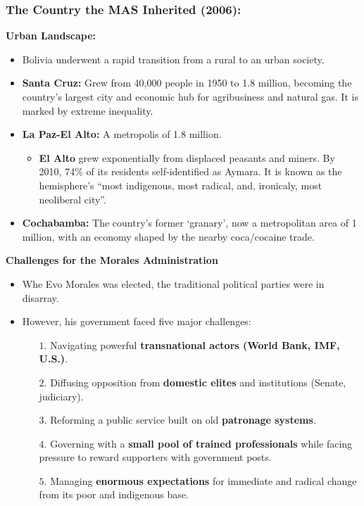 \documentclass{article}
\begin{document}
    \subsubsection{The Country the MAS Inherited (2006):}
    \noindent \textbf{Urban Landscape:}
    \begin{itemize}
        \item Bolivia underwent a rapid transition from a rural to an urban
        society.
        \item \textbf{Santa Cruz:} Grew from 40,000 people in 1950 to 1.8
        million, becoming the country's largest city and economic hub for
        agribusiness and natural gas. It is marked by extreme inequality.
        \item \textbf{La Paz-El Alto:} A metropolis of 1.8 million.
        \begin{itemize}
            \item \textbf{El Alto} grew exponentially from displaced
            peasants and miners. By 2010, 74\% of its residents
            self-identified as Aymara. It is known as the hemisphere's
            ``most indigenous, most radical, and, ironicaly, most neoliberal
            city''.
        \end{itemize}
        \item \textbf{Cochabamba:} The country's former `granary', now a
        metropolitan area of 1 million, with an economy shaped by the nearby
        coca/cocaine trade.
    \end{itemize}

    \noindent \textbf{Challenges for the Morales Administration}
    \begin{itemize}
        \item Whe Evo Morales was elected, the traditional political parties
        were in disarray.
        \item However, his government faced five major challenges:
        \begin{itemize}
            \item [$1$.] Navigating powerful
            \textbf{transnational actors (World Bank, IMF, U.S.)}.
            \item[$2$.] Diffusing opposition from \textbf{domestic elites}
            and institutions (Senate, judiciary).
            \item[$3$.] Reforming a public service built on old
            \textbf{patronage systems}.
            \item[$4$.] Governing with a
            \textbf{small pool of trained professionals} while facing
            pressure to reward supporters with government posts.
            \item[$5$.] Managing \textbf{enormous expectations} for
            immediate and radical change from its poor and indigenous base.
        \end{itemize}
    \end{itemize}
\end{document}
